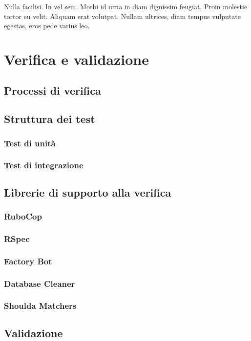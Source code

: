 
\begin{savequote}[75mm]
Nulla facilisi. In vel sem. Morbi id urna in diam dignissim feugiat. Proin molestie tortor eu velit. Aliquam erat volutpat. Nullam ultrices, diam tempus vulputate egestas, eros pede varius leo.
\end{savequote}

\chapter{Verifica e validazione}
\section{Processi di verifica}
\section{Struttura dei test}
\subsection{Test di unità}
\subsection{Test di integrazione}
\section{Librerie di supporto alla verifica}
\subsection{RuboCop}
\subsection{RSpec}
\subsection{Factory Bot}
\subsection{Database Cleaner}
\subsection{Shoulda Matchers}
\section{Validazione}


